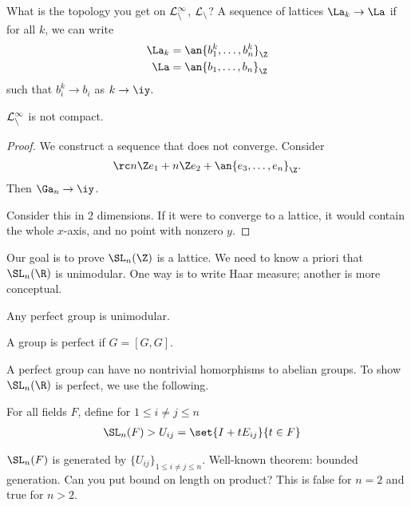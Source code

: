What is the topology you get on $\cal L_n^1$, $\cal L_n$? A sequence of lattices $\La_k\to \La$ if for all $k$, we can write
\begin{align}
\La_k &= \an{b_1^k,\ldots, b_n^k}_\Z\\
\La &= \an{b_1,\ldots, b_n}_\Z
\end{align}
such that $b_i^k\to b_i$ as $k\to \iy$.
\begin{clm}
$\cal L_n^1$ is not compact. 
\end{clm}
\begin{proof}
We construct a sequence that does not converge. Consider
\begin{gather}
\rc n \Z e_1 + n\Z e_2 + \an{e_3,\ldots, e_{n}}_\Z.
\end{gather}
Then $\Ga_n\to \iy$. 

Consider this in 2 dimensions. If it were to converge to a lattice, it would contain the whole $x$-axis, and no point with nonzero $y$.
\end{proof}
Our goal is to prove $\SL_n(\Z)$ is a lattice. 
We need to know a priori that $\SL_n(\R)$ is unimodular. One way is to write Haar measure; another is more conceptual. 
\begin{thm}
Any perfect group is unimodular.
\end{thm}
\begin{df}
A group is perfect if $G=[G,G]$.
\end{df}
A perfect group can have no nontrivial homorphisms to abelian groups. 
To show $\SL_n(\R)$ is perfect, we use the following.
\begin{lem}
For all fields $F$, define for $1\le i\ne j\le n$
\begin{align}
\SL_n(F) > U_{ij} &= \set{I + tE_{ij}}{t\in F}
\end{align}
\end{lem}
$\SL_n(F)$ is generated by $\{U_{ij}\}_{1\le i\ne j\le n}$. %
Well-known theorem: bounded generation. Can you put bound on length on product? This is false for $n=2$ and true for $n>2$.
